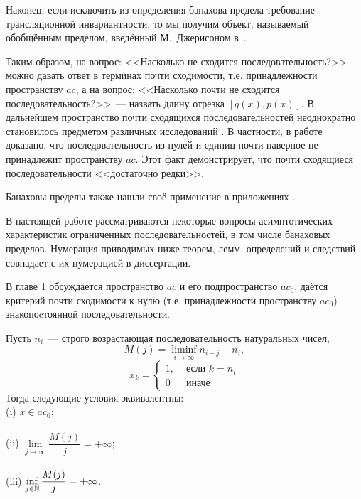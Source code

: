 Наконец, если исключить из определения банахова предела требование трансляционной инвариантности,
то мы получим объект, называемый обобщённым пределом, введённый М.~Джерисоном в~\cite{jerison1957set}.


Таким образом, на вопрос: <<Насколько не сходится последовательность?>> %
можно давать ответ в терминах почти сходимости, т.е. принадлежности пространству $ac$,
а на вопрос: <<Насколько почти не сходится последовательность?>>~---
назвать длину отрезка $[q(x), p(x)]$.
В дальнейшем пространство почти сходящихся последовательностей неоднократно становилось предметом
различных исследований
\cite{semenov2006space,usachev2008transformations}.
В частности, в работе~\cite{connor1990almost} доказано,
что последовательность из нулей и единиц почти наверное не принадлежит пространству $ac$.
Этот факт демонстрирует, что почти сходящиеся последовательности <<достаточно редки>>.


Банаховы пределы также нашли своё применение в приложениях
\cite{semenov2015banachtraces,semenov2009fourier,strukova2015spectres}.



В настоящей работе рассматриваются некоторые вопросы асимптотических характеристик ограниченных последовательностей,
в том числе банаховых пределов.
Нумерация приводимых ниже теорем, лемм, определений и следствий совпадает с их нумерацией в диссертации.


В главе 1 обсуждается пространство $ac$ и его подпространство $ac_0$,
даётся критерий почти сходимости к нулю (т.е. принадлежности пространству $ac_0$)
знакопоcтоянной последовательности.

	Пусть $n_i$~--- строго возрастающая последовательность натуральных чисел,
	\begin{equation}
		\label{eq:definition_M_j}
		M(j) = \liminf_{i\to\infty} n_{i+j} - n_i,
	\end{equation}
	\begin{equation}
		x_k = \left\{\begin{array}{ll}
			1, & \mbox{~если~} k = n_i
			\\
			0  & \mbox{~иначе~}
		\end{array}\right.
	\end{equation}
	Тогда следующие условия эквивалентны:
	\\
	(i)   $x \in ac_0$;
	\\\\
	(ii)  $\lim\limits_{j \to \infty} \dfrac{M(j)}{j} = +\infty$;
	\\\\
	(iii) $\inf\limits_{j \in \mathbb{N}}     \dfrac{M(j)}{j} = +\infty$.


